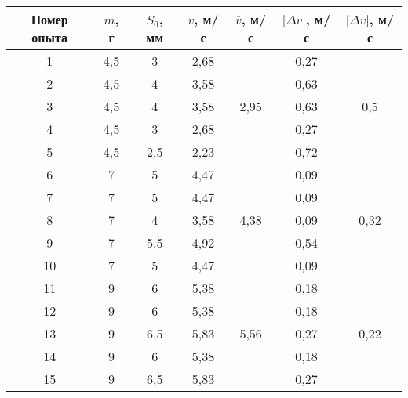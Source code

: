 \begin{tabular}{|c|c|c|c|c|c|c|}
    \hline
    Номер опыта & $m$, г & $S_0$, мм & $v$, м/с & $\overline{v}$, м/с & $|\Delta v|$, м/с & $\overline{|\Delta v|}$, м/с \\ 
    \hline
              1 & 4,5    & 3         & 2,68     & \multirow{5}{*}{2,95}         & 0,27             & \multirow{5}{*}{0,5}                     \\ 
    \cline{1-4} \cline{6-6}
              2 & 4,5    & 4         & 3,58     &                               & 0,63             &                      \\ 
    \cline{1-4} \cline{6-6}
              3 & 4,5    & 4         & 3,58     &                               & 0,63             &                      \\ 
    \cline{1-4} \cline{6-6}
              4 & 4,5    & 3         & 2,68     &                               & 0,27             &                      \\ 
    \cline{1-4} \cline{6-6}
              5 & 4,5    & 2,5       & 2,23     &                               & 0,72             &                      \\  
    \hline
              6 & 7      & 5         & 4,47     & \multirow{5}{*}{4,38}         & 0,09             & \multirow{5}{*}{0,32}                     \\ 
    \cline{1-4} \cline{6-6}
              7 & 7      & 5         & 4,47     &                               & 0,09             &                      \\ 
    \cline{1-4} \cline{6-6}
              8 & 7      & 4         & 3,58     &                               & 0,09             &                      \\ 
    \cline{1-4} \cline{6-6}
              9 & 7      & 5,5       & 4,92     &                               & 0,54             &                      \\ 
    \cline{1-4} \cline{6-6}
             10 & 7      & 5         & 4,47     &                               & 0,09             &                      \\ 
    \hline
             11 & 9      & 6         & 5,38     & \multirow{5}{*}{5,56}         & 0,18             & \multirow{5}{*}{0,22}                     \\ 
    \cline{1-4} \cline{6-6}
             12 & 9      & 6         & 5,38     &                               & 0,18             &                      \\ 
    \cline{1-4} \cline{6-6}
             13 & 9      & 6,5       & 5,83     &                               & 0,27             &                      \\ 
    \cline{1-4} \cline{6-6}
             14 & 9      & 6         & 5,38     &          										  & 0,18             &                      \\ 
    \cline{1-4} \cline{6-6}
             15 & 9      & 6,5       & 5,83     &           									  & 0,27             &                      \\ 
    \hline
\end{tabular}
